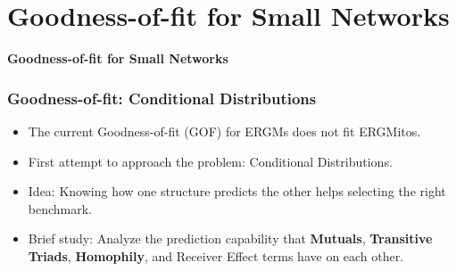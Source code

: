 \documentclass[aspectratio=169, 9pt, handout]{beamer}
\begin{document}
\section{Goodness-of-fit for Small Networks}

\begin{frame}[c]
\textcolor{uscgold}{
\Large {\bf Goodness-of-fit for Small Networks}
}
\end{frame}



\begin{frame}
	\frametitle{Goodness-of-fit: Conditional Distributions}
	\begin{itemize}
		\item The current Goodness-of-fit (GOF) for ERGMs does not fit ERGMitos.\pause
		\item First attempt to approach the problem: Conditional Distributions.\pause
		\item Idea: Knowing how one structure predicts the other helps selecting the right benchmark.\pause
		\item Brief study: Analyze the prediction capability that \textbf{Mutuals}, \textbf{Transitive Triads}, \textbf{Homophily}, and Receiver Effect terms have on each other.
	\end{itemize}
	
\begin{figure}
	
	\centering
	\def\svgwidth{.6\linewidth}
	
	\label{fig:maxout-gof-chapter}
\end{figure}
\end{frame}
\end{document}
